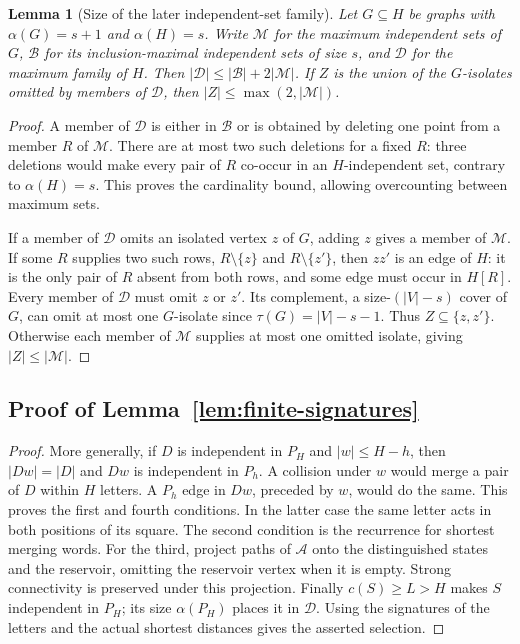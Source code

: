 \documentclass[11pt]{article}
\newtheorem{lemma}[theorem]{Lemma}
\theoremstyle{definition}
\theoremstyle{plain}
\begin{document}
\begin{lemma}[Size of the later independent-set family]\label{lem:row-capacity}
Let $G\subseteq H$ be graphs with $\alpha(G)=s+1$ and
$\alpha(H)=s$. Write $\mathcal M$ for the maximum independent
sets of $G$, $\mathcal B$ for its inclusion-maximal independent
sets of size $s$, and $\mathcal D$ for the maximum family of $H$.
Then $|\mathcal D|\le|\mathcal B|+2|\mathcal M|$.
If $Z$ is the union of the $G$-isolates omitted by members of
$\mathcal D$, then $|Z|\le\max(2,|\mathcal M|)$.
\end{lemma}
\begin{proof}
A member of $\mathcal D$ is either in $\mathcal B$ or is obtained
by deleting one point from a member $R$ of $\mathcal M$.
There are at most two such deletions for a fixed $R$:
three deletions would make every pair of $R$ co-occur in an
$H$-independent set, contrary to $\alpha(H)=s$.
This proves the cardinality bound, allowing overcounting between
maximum sets.

If a member of $\mathcal D$ omits an isolated vertex $z$ of $G$, adding $z$ gives
a member of $\mathcal M$. If some $R$ supplies two such rows,
$R\setminus\{z\}$ and $R\setminus\{z'\}$, then $zz'$ is
an edge of $H$: it is the only pair of $R$ absent from both rows,
and some edge must occur in $H[R]$.
Every member of $\mathcal D$ must omit $z$ or $z'$.
Its complement, a size-$(|V|-s)$ cover of $G$, can omit at most
one $G$-isolate since $\tau(G)=|V|-s-1$.
Thus $Z\subseteq\{z,z'\}$.
Otherwise each member of $\mathcal M$ supplies at most one omitted
isolate, giving $|Z|\le|\mathcal M|$.
\end{proof}

\subsection*{Proof of Lemma~\ref{lem:finite-signatures}}
\begin{proof}
More generally, if $D$ is independent in $P_H$ and $|w|\le H-h$,
then $|Dw|=|D|$ and $Dw$ is independent in $P_h$.
A collision under $w$ would merge a pair of $D$ within $H$ letters.
A $P_h$ edge in $Dw$, preceded by $w$, would do the same.
This proves the first and fourth conditions. In the latter case the
same letter acts in both positions of its square.
The second condition is the recurrence for shortest merging words.
For the third, project paths of $\mathcal A$ onto the distinguished
states and the reservoir, omitting the reservoir vertex when
it is empty. Strong connectivity is preserved under this projection.
Finally $c(S)\ge L>H$ makes $S$ independent in $P_H$; its size
$\alpha(P_H)$ places it in $\mathcal D$.
Using the signatures of the letters and the actual shortest distances
gives the asserted selection.
\end{proof}
\end{document}
